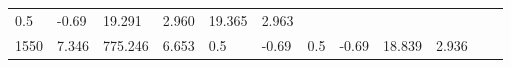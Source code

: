 \documentclass{article}
\begin{document}
\begin{longtable}[]{@{}llllllllllll@{}}
\begin{minipage}[t]{0.03\columnwidth}
0.5\strut
\end{minipage} & \begin{minipage}[t]{0.06\columnwidth}\raggedright\strut
-0.69\strut
\end{minipage} & \begin{minipage}[t]{0.06\columnwidth}\raggedright\strut
19.291\strut
\end{minipage} & \begin{minipage}[t]{0.08\columnwidth}\raggedright\strut
2.960\strut
\end{minipage} & \begin{minipage}[t]{0.06\columnwidth}\raggedright\strut
19.365\strut
\end{minipage} & \begin{minipage}[t]{0.09\columnwidth}\raggedright\strut
2.963\strut
\end{minipage}\tabularnewline
\begin{minipage}[t]{0.03\columnwidth}\raggedright\strut
1550\strut
\end{minipage} & \begin{minipage}[t]{0.06\columnwidth}\raggedright\strut
7.346\strut
\end{minipage} & \begin{minipage}[t]{0.06\columnwidth}\raggedright\strut
775.246\strut
\end{minipage} & \begin{minipage}[t]{0.08\columnwidth}\raggedright\strut
6.653\strut
\end{minipage} & \begin{minipage}[t]{0.03\columnwidth}\raggedright\strut
0.5\strut
\end{minipage} & \begin{minipage}[t]{0.06\columnwidth}\raggedright\strut
-0.69\strut
\end{minipage} & \begin{minipage}[t]{0.03\columnwidth}\raggedright\strut
0.5\strut
\end{minipage} & \begin{minipage}[t]{0.06\columnwidth}\raggedright\strut
-0.69\strut
\end{minipage} & \begin{minipage}[t]{0.06\columnwidth}\raggedright\strut
18.839\strut
\end{minipage} & \begin{minipage}[t]{0.08\columnwidth}\raggedright\strut
2.936\strut
\end{minipage} & \begin{minipage}[t]{0.06\columnwidth}\raggedright\strut

\end{minipage}
\end{longtable}
\end{document}
